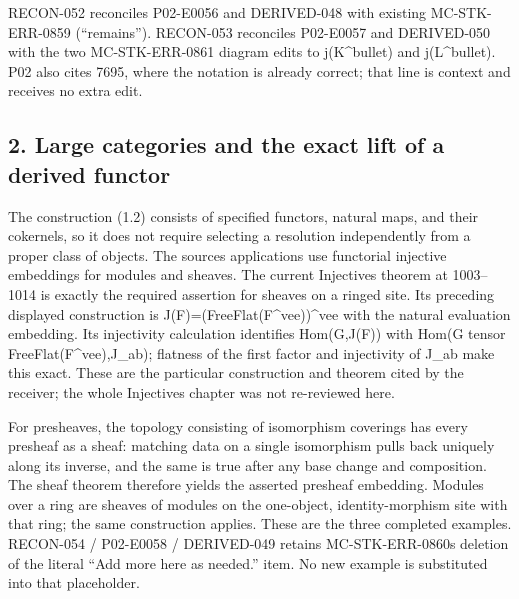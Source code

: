 RECON-052 reconciles P02-E0056 and DERIVED-048 with existing MC-STK-ERR-0859 (“remains”)\allowbreak{}. RECON-053 reconciles P02-E0057 and DERIVED-050 with the two MC-STK-ERR-0861 diagram edits to j(K\textasciicircum{}bullet)\allowbreak{} and j(L\textasciicircum{}bullet)\allowbreak{}. P02 also cites 7695,\allowbreak{} where the notation is already correct; that line is context and receives no extra edit.

\subsection{2. Large categories and the exact lift of a derived functor}\label{proofs-7589-8350-large-categories-and-the-exact-lift-of-a-derived-functor}

The construction (1.2)\allowbreak{} consists of specified functors,\allowbreak{} natural maps,\allowbreak{} and their cokernels,\allowbreak{} so it does not require selecting a resolution independently from a proper class of objects. The source\textquotesingle s applications use functorial injective embeddings for modules and sheaves. The current Injectives theorem at 1003–\allowbreak{}1014 is exactly the required assertion for sheaves on a ringed site. Its preceding displayed construction is J(F)\allowbreak{}\allowbreak{}=(FreeFlat(F\textasciicircum{}vee)\allowbreak{})\allowbreak{}\textasciicircum{}vee with the natural evaluation embedding. Its injectivity calculation identifies Hom(G,\allowbreak{}J(F)\allowbreak{})\allowbreak{} with Hom(G tensor FreeFlat(F\textasciicircum{}vee)\allowbreak{},\allowbreak{}J\_\allowbreak{}ab)\allowbreak{}; flatness of the first factor and injectivity of J\_\allowbreak{}ab make this exact. These are the particular construction and theorem cited by the receiver; the whole Injectives chapter was not re-reviewed here.

For presheaves,\allowbreak{} the topology consisting of isomorphism coverings has every presheaf as a sheaf:\allowbreak{} matching data on a single isomorphism pulls back uniquely along its inverse,\allowbreak{} and the same is true after any base change and composition. The sheaf theorem therefore yields the asserted presheaf embedding. Modules over a ring are sheaves of modules on the one-object,\allowbreak{} identity-morphism site with that ring; the same construction applies. These are the three completed examples. RECON-054 /\allowbreak{} P02-E0058 /\allowbreak{} DERIVED-049 retains MC-STK-ERR-0860\textquotesingle s deletion of the literal ``Add more here as needed.'' item. No new example is substituted into that placeholder.

